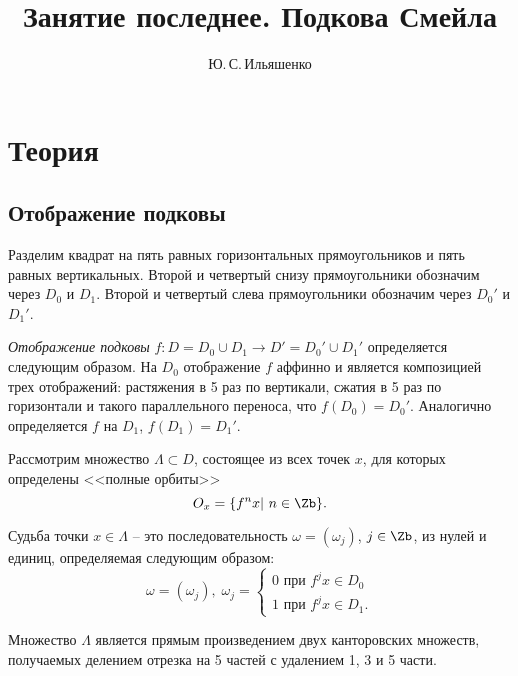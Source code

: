 \documentclass[a4paper]{article}
\author{Ю.\,С.\,Ильяшенко}
\title{Занятие последнее. Подкова Смейла}
\begin{document}
\maketitle

\section{Теория}

\subsection{Отображение подковы}

  Разделим квадрат на пять равных горизонтальных прямоугольников и пять равных
вертикальных.
 Второй и четвертый снизу прямоугольники обозначим через $D_0$ и $D_1$. Второй и
четвертый слева прямоугольники обозначим через  $D_0'$ и $D_1'$.

{\it Отображение подковы} $f:D=D_0\cup D_1\to D'=D_0'\cup D_1'$
определяется следующим образом. На $D_0$ отображение $f$ аффинно и
является композицией трех отображений: растяжения в 5 раз по
вертикали, сжатия в 5 раз по горизонтали и такого параллельного
переноса, что $f(D_0)=D_0'$. Аналогично определяется $f$ на $D_1$,
$f(D_1)=D_1'$.

Рассмотрим множество $\Lambda\subset D$, состоящее из всех точек
$x$, для которых определены <<полные орбиты>>
$$
O_x=\{f^nx|\ n\in \Zb \}.
$$

\begin{def}
Судьба точки $x\in \Lambda$ -- это последовательность $\omega =(\omega_j)$,
$j\in \Zb$, из нулей и единиц, определяемая следующим образом:
$$
\omega =(\omega_j),\; \omega_j=
\begin{cases}
0 \text{ при } f^jx\in D_0 \\
1 \mbox{ при } f^jx\in D_1.
\end{cases}
$$
\end{def}

\begin{proclaim}[Теорема 1] Множество $\Lambda$ является прямым
произведением двух канторовских множеств,
 получаемых делением отрезка на 5 частей с удалением 1, 3 и 5 части.
\end{proclaim}
\end{document}
